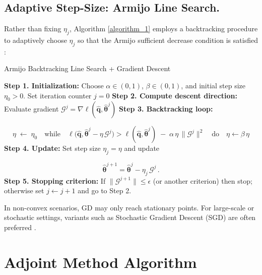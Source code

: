 \newpage

\subsection*{Adaptive Step-Size: Armijo Line Search.} 
Rather than fixing $\eta_j$, Algorithm \ref{algorithm_1} employs a backtracking procedure to adaptively choose $\eta_j$ so that the Armijo sufficient decrease condition is satisfied \cite{nocedal1999numerical}:

\begin{center}
\begin{minipage}{0.95\textwidth}
\begin{algorithm}[H]
\label{algorithm_1}
\SetAlgoLined
\caption{Armijo Backtracking Line Search + Gradient Descent}
\textbf{Step 1. Initialization:} Choose $\alpha\in(0,1)$, $\beta\in(0,1)$, and initial step size $\eta_{0} > 0$. Set iteration counter $j=0$\;
\textbf{Step 2. Compute descent direction:} Evaluate gradient $\mathscr{G}^j = \nabla \ell(\hat{\mathbf{q}},\hat{\bm\theta}^j)$\;
\textbf{Step 3. Backtracking loop:}

$$\eta \;\leftarrow\;\eta_{0}
    \quad\text{while}\quad
    \ell\bigl(\hat{\mathbf{q}},\hat{\bm\theta}^j - \eta\,\mathscr{G}^j\bigr)
    >
    \ell(\hat{\mathbf{q}},\hat{\bm\theta}^j)
    \;-\;\alpha\,\eta\,\|\mathscr{G}^j\|^2
    \quad\text{do}\quad
    \eta \leftarrow \beta\,\eta$$
\textbf{Step 4. Update:} Set step size $\eta_j = \eta$ and update

$$\hat{\bm\theta}^{j+1} = \hat{\bm\theta}^j - \eta_j\,\mathscr{G}^j\,.$$
\textbf{Step 5. Stopping criterion:} If $\|\mathscr{G}^{j+1}\|\le\epsilon$ (or another criterion) then stop; otherwise set $j\leftarrow j+1$ and go to Step 2.
\end{algorithm}
\end{minipage}
\end{center}


In non-convex scenarios, GD may only reach stationary points.  For large-scale or stochastic settings, variants such as Stochastic Gradient Descent (SGD) are often preferred \cite{ruder2017overviewgradientdescentoptimization}.



\section{Adjoint Method Algorithm}

